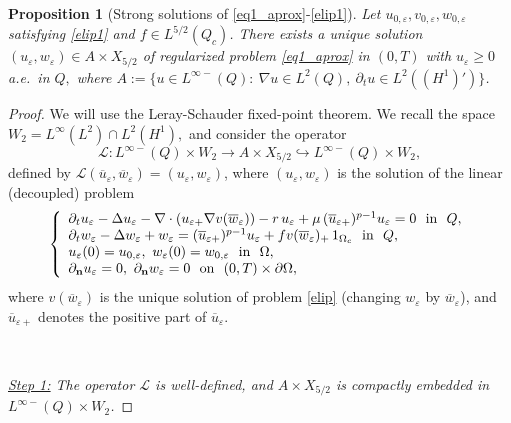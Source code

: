 \documentclass[11pt,reqno]{amsart}%
\newtheorem{proposition}[theorem]{Proposition}
\numberwithin{equation}{section}
\begin{document}
{\begin{proposition}[Strong solutions of  \eqref{eq1_aprox}-\eqref{elip1}]\label{solution_regu}
Let $u_{0,\varepsilon},v_{0,\varepsilon},w_{0,\varepsilon}$ satisfying  \eqref{elip1} and $f\in L^{5/2}(Q_c)$. There exists a unique solution $(u_\varepsilon,w_\varepsilon)\in A\times X_{5/2}$ of regularized problem \eqref{eq1_aprox} in $(0,T)$ with $u_\varepsilon\ge0$ a.e.\ in $Q,$ where $A:=\{ u\in L^{\infty-}(Q):\ \nabla u\in L^2(Q),\ \partial_t u\in L^2((H^1)')\}$.
\end{proposition} 
\begin{proof}
We will use the Leray-Schauder fixed-point theorem. We recall the space $W_2=L ^\infty(L^2)\cap L^2(H^1),$ and consider the operator
$$
\mathcal{L}:L^{\infty-}(Q)\times W_2\to A\times X_{5/2}\hookrightarrow L^{\infty-}(Q)\times W_2,
$$
defined by $\mathcal{L}(\overline{u}_\varepsilon,\overline{w}_\varepsilon)=(u_\varepsilon,w_\varepsilon)$, where $(u_\varepsilon,w_\varepsilon)$ is the solution of the linear (decoupled) problem 
\begin{equation}\label{A1}
\left\{
\begin{array}{l}
\partial_tu_\varepsilon-\Delta u_\varepsilon
-\nabla\cdot({u}_{\varepsilon+}\nabla v(\overline{w}_\varepsilon))
-r\, u_{\varepsilon}+\mu \,  (\overline u_{\varepsilon +})^{p-1}{u_{\varepsilon}}=0
\ \mbox{ in }\ Q,\\
\partial_tw_\varepsilon-\Delta w_\varepsilon+w_\varepsilon
=  (\overline u_{\varepsilon +} )^{p-1}{u_{\varepsilon}}
+f v(\overline{w}_{\varepsilon })_+\,1_{\Omega_c}\ \mbox{ in }\ Q,\\
u_\varepsilon(0)=u_{0, \varepsilon},\ w_\varepsilon(0)=
w_{0,\varepsilon}\ \mbox{ in }\ \Omega,\\
{\partial_{\bf n} u_\varepsilon}=0,\ {\partial_{\bf n} w_\varepsilon}=0\ \mbox{ on }\ (0,T)\times\partial\Omega,
\end{array}
\right.
\end{equation}
where $v(\overline{w}_\varepsilon)$ 
is the unique solution  of problem \eqref{elip} (changing $w_\varepsilon$ by $\overline w_\varepsilon$),
 and $\overline{u}_{\varepsilon+}$ 
denotes the positive part of $\overline{u}_\varepsilon$.
 
\

{\it  \underline{Step 1:} The operator $\mathcal{L}$ is well-defined, and  $A\times X_{5/2}$ is compactly embedded in $L^{\infty-}(Q)\times W_2$.}
\vspace{0.1cm}


\end{proof}}
\end{document}
